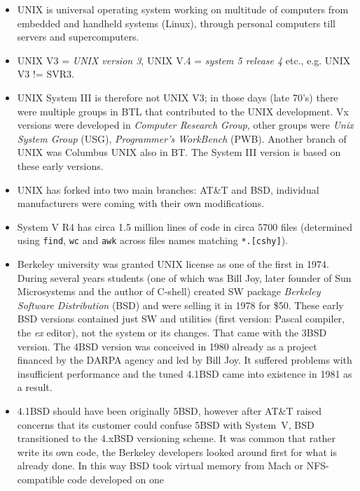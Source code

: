 \begin{itemize}
\item UNIX is universal operating system working on multitude of computers from
embedded and handheld systems (Linux), through personal computers till servers
and supercomputers.
\item UNIX V3 = \emph{UNIX version 3}, UNIX V.4 = \emph{system 5 release 4}
etc., e.g. UNIX V3 != SVR3.
\item UNIX System III is therefore not UNIX V3; in those days (late 70's) there
were multiple groups in BTL that contributed to the UNIX development. Vx
versions were developed in \emph{Computer Research Group}, other groups were
\emph{Unix System Group} (USG), \emph{Programmer's WorkBench} (PWB).
Another branch of UNIX was Columbus UNIX also in BT. The System III version is
based on these early versions.
\item UNIX has forked into two main branches: AT\&T and BSD, individual
manufacturers were coming with their own modifications.
\item System V R4 has circa 1.5 million lines of code
in circa 5700 files (determined using \texttt{find}, \texttt{wc} and
\texttt{awk} across files names matching \texttt{*.[cshy]}).
\item Berkeley university was granted UNIX license as one of the first in
1974. During several years students (one of which was Bill Joy, later
founder of Sun Microsystems and the author of C-shell) created SW package
\emph{Berkeley Software Distribution} (BSD) and were selling it in 1978 for
\$50. These early BSD versions contained just SW and utilities (first version:
Pascal compiler, the \emph{ex} editor), not the system or its changes.
That came with the 3BSD version. The 4BSD version was conceived in 1980 already
as a project financed by the DARPA agency and led by Bill Joy. It suffered
problems with insufficient performance and the tuned 4.1BSD came into existence
in 1981 as a result.
\item 4.1BSD should have been originally 5BSD, however after AT\&T raised
concerns that its customer could confuse 5BSD with System~V, BSD transitioned to
the 4.xBSD versioning scheme. It was common that rather write its own code, the
Berkeley developers looked around first for what is already done. In this way
BSD took virtual memory from Mach or NFS-compatible code developed on one

\end{itemize}
